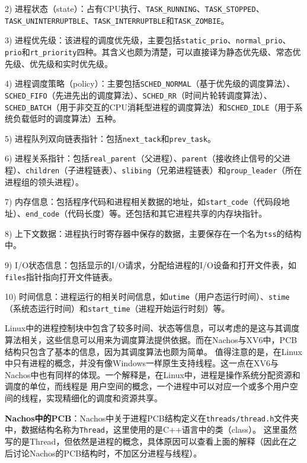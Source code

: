 2) 进程状态（state）：占有CPU执行、\texttt{TASK\_RUNNING}、\texttt{TASK\_STOPPED}、\texttt{TASK\_UNINTERRUPTBLE}、\texttt{TASK\_INTERRUPTBLE}和\texttt{TASK\_ZOMBIE}。

3) 进程优先级：该进程的调度优先级，主要包括\texttt{static\_prio}、\texttt{normal\_prio}、\texttt{prio}和\texttt{rt\_priority}四种。其含义也颇为清楚，可以直接译为静态优先级、常态优先级、优先级和实时优先级。

4) 进程调度策略（policy）：主要包括\texttt{SCHED\_NORMAL}（基于优先级的调度算法）、\texttt{SCHED\_FIFO}（先进先出的调度算法）、\texttt{SCHED\_RR}（时间片轮转调度算法）、\texttt{SCHED\_BATCH}（用于非交互的CPU消耗型进程的调度算法）和\texttt{SCHED\_IDLE}（用于系统负载低时的调度算法）五种。

5) 进程队列双向链表指针：包括\texttt{next\_tack}和\texttt{prev\_task}。

6) 进程关系指针：包括\texttt{real\_parent}（父进程）、\texttt{parent}（接收终止信号的父进程）、\texttt{children}（子进程链表）、\texttt{slibing}（兄弟进程链表）和\texttt{group\_leader}（所在进程组的领头进程）。

7) 内存信息：包括程序代码和进程相关数据的地址，如\texttt{start\_code}（代码段地址）、\texttt{end\_code}（代码长度）等。还包括和其它进程共享的内存块指针。

8) 上下文数据：进程执行时寄存器中保存的数据，主要保存在一个名为\texttt{tss}的结构中。

9) I/O状态信息：包括显示的I/O请求，分配给进程的I/O设备和打开文件表，如\texttt{files}指针指向打开文件链表。

10) 时间信息：进程运行的相关时间信息，如\texttt{utime}（用户态运行时间）、\texttt{stime}（系统态运行时间）和\texttt{start\_time}（进程开始运行时刻）等。

Linux中的进程控制块中包含了较多时间、状态等信息，可以考虑的是这与其调度算法相关，这些信息可以用来为调度算法提供依据。而在Nachos与XV6中，PCB结构只包含了基本的信息，因为其调度算法也颇为简单。
值得注意的是，在Linux中只有进程的概念，并没有像Windows一样原生支持线程。这一点在XV6与Nachos中也有同样的体现。一个解释是，在Linux中，进程是操作系统分配资源和调度的单位，而线程是
用户空间的概念，一个进程中可以对应一个或多个用户空间的线程，实现精细化的调度和资源共享。

\textbf{Nachos中的PCB}：Nachos中关于进程PCB结构定义在\texttt{threads/thread.h}文件夹
中，数据结构名称为\texttt{Thread}，这里使用的是C++语言中的类（class）。
这里虽然写的是Thread，但依然是进程的概念，具体原因可以查看上面的解释（因此在之后讨论Nachos的PCB结构时，不加区分进程与线程）。

